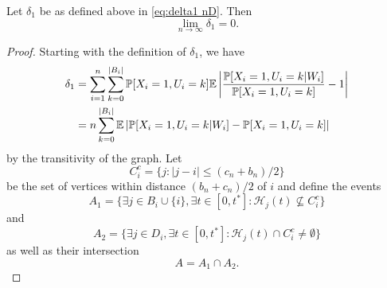 	\begin{lemma}
	\label{lem:delta1 goes to 0 general}
		Let $\delta_1$ be as defined above in \eqref{eq:delta1 nD}. Then
		\begin{equation}
			\lim_{n\rightarrow\infty} \delta_1 = 0.
		\end{equation}
	\end{lemma}
	\begin{proof}
		Starting with the definition of $\delta_1$, we have
		\begin{align}
			\delta_1 &= \sum_{i = 1}^n \sum_{k = 0}^{|B_i|} \prob[X_i = 1, U_i = k] \expect \left| \frac{\prob[X_i = 1, U_i = k|W_i]}{\prob[X_i = 1, U_i = k]} - 1 \right|\\
			&= n \sum_{k = 0}^{|B_i|} \expect \left|\prob[X_i = 1, U_i = k|W_i] - \prob[X_i = 1, U_i = k] \right|%
			\label{eq:nD delta1 line 2}
		\end{align}
		by the transitivity of the graph.
		Let
		\begin{equation}
			C_i^c = \{j : |j - i| \leq (c_n + b_n)/2\}
		\end{equation}
		be the set of vertices within distance $(b_n + c_n)/2$ of $i$ and define the events
		\begin{equation}
			A_1 = \{\exists j \in B_i \cup \{i\}, \exists t \in [0, t^*] : \mathcal{H}_j(t) \nsubseteq  C_i^c\}
		\end{equation}
		and
		\begin{equation}
			A_2 = \{\exists j \in D_i, \exists t \in [0, t^*] : \mathcal{H}_j(t) \cap C_i^c \neq \emptyset\}
		\end{equation}
		as well as their intersection
		\begin{equation}
			A = A_1 \cap A_2.
		\end{equation}


\end{proof}
